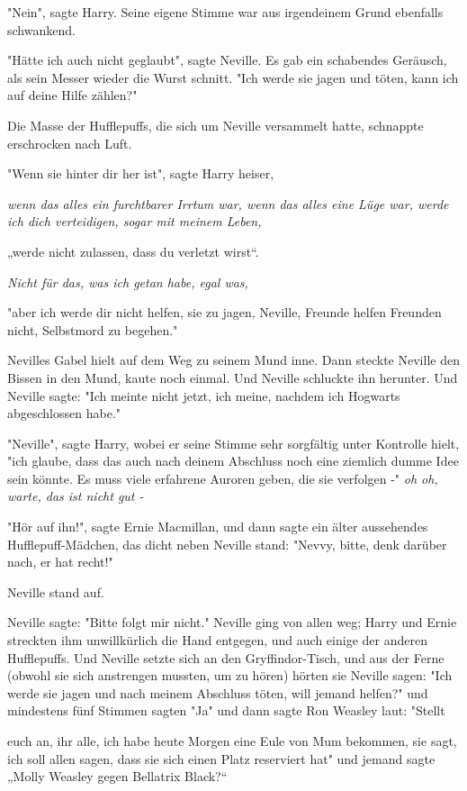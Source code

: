 {"Nein", sagte Harry. Seine eigene Stimme war aus irgendeinem Grund ebenfalls schwankend.

"Hätte ich auch nicht geglaubt", sagte Neville. Es gab ein schabendes Geräusch, als sein Messer wieder die Wurst schnitt. "Ich werde sie jagen und töten, kann ich auf deine Hilfe zählen?"

Die Masse der Hufflepuffs, die sich um Neville versammelt hatte, schnappte erschrocken nach Luft.

"Wenn sie hinter dir her ist", sagte Harry heiser,

\emph{wenn das alles ein furchtbarer Irrtum war, wenn das alles eine Lüge war, werde ich dich verteidigen, sogar mit meinem Leben,}

„werde nicht zulassen, dass du verletzt wirst“.

\emph{Nicht für das, was ich getan habe, egal was,}

"aber ich werde dir nicht helfen, sie zu jagen, Neville, Freunde helfen Freunden nicht, Selbstmord zu begehen."

Nevilles Gabel hielt auf dem Weg zu seinem Mund inne. Dann steckte Neville den Bissen in den Mund, kaute noch einmal. Und Neville schluckte ihn herunter. Und Neville sagte: "Ich meinte nicht jetzt, ich meine, nachdem ich Hogwarts abgeschlossen habe."

"Neville", sagte Harry, wobei er seine Stimme sehr sorgfältig unter Kontrolle hielt, "ich glaube, dass das auch nach deinem Abschluss noch eine ziemlich dumme Idee sein könnte. Es muss viele erfahrene Auroren geben, die sie verfolgen -" \emph{oh oh,} \emph{warte, das ist nicht gut -}

"Hör auf ihn!", sagte Ernie Macmillan, und dann sagte ein älter aussehendes Hufflepuff-Mädchen, das dicht neben Neville stand: "Nevvy, bitte, denk darüber nach, er hat recht!"

Neville stand auf.

Neville sagte: "Bitte folgt mir nicht." Neville ging von allen weg; Harry und Ernie streckten ihm unwillkürlich die Hand entgegen, und auch einige der anderen Hufflepuffs. Und Neville setzte sich an den Gryffindor-Tisch, und aus der Ferne (obwohl sie sich anstrengen mussten, um zu hören) hörten sie Neville sagen: "Ich werde sie jagen und nach meinem Abschluss töten, will jemand helfen?" und mindestens fünf Stimmen sagten "Ja" und dann sagte Ron Weasley laut: "Stellt

euch an, ihr alle, ich habe heute Morgen eine Eule von Mum bekommen, sie sagt, ich soll allen sagen, dass sie sich einen Platz reserviert hat" und jemand sagte „Molly Weasley gegen Bellatrix Black?“

}
